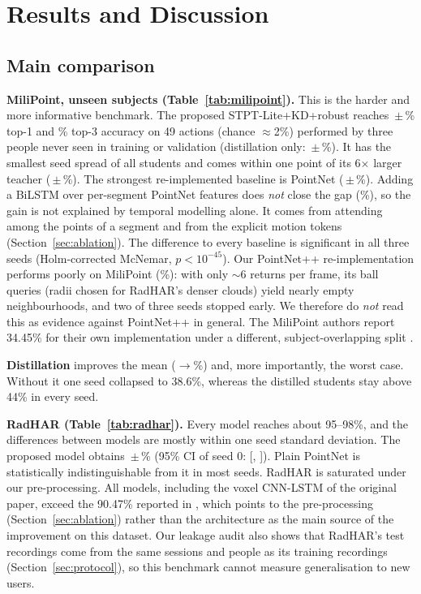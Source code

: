 \section{Results and Discussion}
\label{sec:results}




\subsection{Main comparison}
\textbf{MiliPoint, unseen subjects (Table~\ref{tab:milipoint}).} This is the
harder and more informative benchmark. The proposed STPT-Lite+KD+robust
reaches \mistptlitekdrobustAcc\,$\pm$\,\mistptlitekdrobustStd\% top-1 and
\mistptlitekdrobustTopthree\% top-3 accuracy on 49 actions (chance
$\approx$2\%) performed by three people never seen in training or validation
(distillation only: \mistptlitekdAcc\,$\pm$\,\mistptlitekdStd\%). It has the
smallest seed spread of all students and comes within one point of its
6$\times$ larger teacher (\mistptteacherAcc\,$\pm$\,\mistptteacherStd\%). The strongest
re-implemented baseline is PointNet (\mipointnetAcc\,$\pm$\,\mipointnetStd\%).
Adding a BiLSTM over per-segment PointNet features does \emph{not} close the gap
(\mipointnetlstmAcc\%), so the gain is not explained by temporal modelling alone.
It comes from attending among the points of a segment and from the explicit
motion tokens (Section~\ref{sec:ablation}). The difference to every baseline is
significant in all three seeds (Holm-corrected McNemar, $p<10^{-45}$). Our
PointNet++ re-implementation performs poorly on MiliPoint
(\mipointnetTwoAcc\%): with only $\sim$6 returns per frame, its ball queries
(radii chosen for RadHAR's denser clouds) yield nearly empty neighbourhoods,
and two of three seeds stopped early. We therefore do \emph{not} read this as
evidence against PointNet++ in general. The MiliPoint authors report 34.45\% for
their own implementation under a different, subject-overlapping split
\cite{cui2023milipoint}.

\textbf{Distillation} improves the mean (\mistptliteAcc$\rightarrow$\mistptlitekdAcc\%)
and, more importantly, the worst case. Without it one seed collapsed to 38.6\%,
whereas the distilled students stay above 44\% in every seed.

\textbf{RadHAR (Table~\ref{tab:radhar}).} Every model reaches about 95--98\%,
and the differences between models are mostly within one seed standard
deviation. The proposed model obtains \rastptlitekdrobustAcc\,$\pm$\,\rastptlitekdrobustStd\%
(95\% CI of seed 0: [\raCiLo, \raCiHi]). Plain PointNet is statistically
indistinguishable from it in most seeds. RadHAR is saturated under our
pre-processing. All models, including the voxel CNN-LSTM of the original paper,
exceed the 90.47\% reported in \cite{singh2019radhar}, which points to the
pre-processing (Section~\ref{sec:ablation}) rather than the architecture as the
main source of the improvement on this dataset. Our leakage audit also shows
that RadHAR's test recordings come from the same sessions and people as its
training recordings (Section~\ref{sec:protocol}), so this benchmark cannot
measure generalisation to new users.

